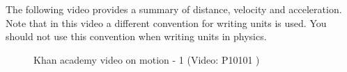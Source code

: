 \label{m38794*eip-307}The following video provides a summary of distance, velocity and acceleration. Note that in this video a different convention for writing units is used. You should not use this convention when writing units in physics.
    \setcounter{subfigure}{0}
	\begin{figure}[H] %
    \textnormal{Khan academy video on motion - 1}\vspace{.1in} \nopagebreak
  \label{m38794*yt-media1}\label{m38794*yt-video1}
             { (Video:  P10101 )}
      \vspace{2pt}
    \vspace{.1in}
 \end{figure}       \par 
